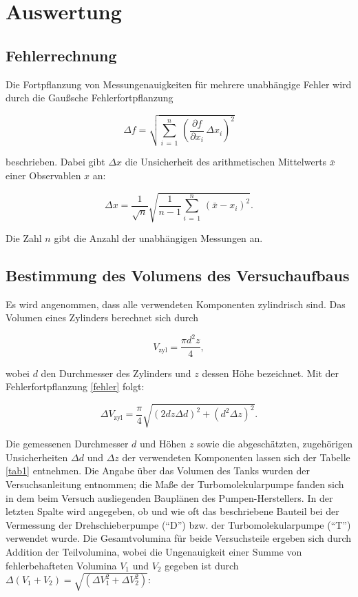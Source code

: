 \section{Auswertung}

	\subsection{Fehlerrechnung}
	
		Die Fortpflanzung von Messungenauigkeiten für mehrere unabhängige Fehler wird durch die Gaußsche Fehlerfortpflanzung
		
		\begin{equation}
			\Delta f = \sqrt{\sum_{i \, = \, 1}^{n} \, \left(\frac{\partial f}{\partial x_i} \, \Delta x_i\right)^2}
			\label{fehler}
		\end{equation}
		
		beschrieben. Dabei gibt $\Delta x$ die Unsicherheit des arithmetischen Mittelwerts $\bar{x}$ einer Observablen $x$ an:
		
		\begin{equation}
			\Delta x = \frac{1}{\sqrt{n}} \sqrt{\frac{1}{n-1} \sum_{i \, = \, 1}^{n} \, \left(\bar{x}- x_i\right)^2}.
		\end{equation}
		
		Die Zahl $n$ gibt die Anzahl der unabhängigen Messungen an.


	\subsection{Bestimmung des Volumens des Versuchaufbaus}
	
		Es wird angenommen, dass alle verwendeten Komponenten zylindrisch sind. Das Volumen eines Zylinders berechnet sich durch
		
		\begin{equation}
			V_\text{zyl} = \frac{\pi d^2 z}{4},
		\end{equation}
		
		wobei $d$ den Durchmesser des Zylinders und $z$ dessen Höhe bezeichnet. Mit der Fehlerfortpflanzung \eqref{fehler} folgt:
		
		\begin{equation}
			\Delta V_\text{zyl} = \frac{\pi}{4} \sqrt{(2 d z \Delta d)^2 + (d^2 \Delta z)^2}.
		\end{equation}
		
		Die gemessenen Durchmesser $d$ und Höhen $z$ sowie die abgeschätzten, zugehörigen Unsicherheiten $\Delta d$ und $\Delta z$ der verwendeten Komponenten lassen sich der Tabelle \ref{tab1} entnehmen. Die Angabe über das Volumen des Tanks wurden der Versuchsanleitung \cite{V70} entnommen; die Maße der Turbomolekularpumpe fanden sich in dem beim Versuch ausliegenden Bauplänen des Pumpen-Herstellers. In der letzten Spalte wird angegeben, ob und wie oft das beschriebene Bauteil bei der Vermessung der Drehschieberpumpe (\enquote{D}) bzw. der Turbomolekularpumpe (\enquote{T}) verwendet wurde. Die Gesamtvolumina für beide Versuchsteile ergeben sich durch Addition der Teilvolumina, wobei die Ungenauigkeit einer Summe von fehlerbehafteten Volumina $V_1$ und $V_2$ gegeben ist durch $\Delta (V_1 + V_2) = \sqrt{\left(\Delta V_1^2 + \Delta V_2^2\right)}$:
		

